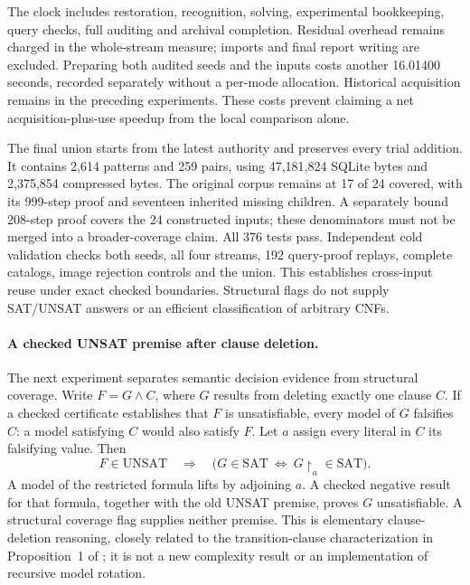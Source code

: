 \documentclass[11pt,a4paper]{article}
\numberwithin{equation}{section}
\theoremstyle{plain}
\theoremstyle{definition}
\theoremstyle{remark}
\begin{document}
The clock includes restoration, recognition, solving, experimental bookkeeping,
query checks, full auditing and archival completion. Residual overhead remains
charged in the whole-stream measure; imports and final report writing are
excluded. Preparing both audited seeds and the inputs costs another 16.01400
seconds, recorded separately without a per-mode allocation. Historical acquisition
remains in the preceding experiments. These costs prevent claiming a net
acquisition-plus-use speedup from the local comparison alone.

The final union starts from the latest authority and preserves every trial
addition. It contains 2,614 patterns and 259 pairs, using 47,181,824 SQLite bytes
and 2,375,854 compressed bytes. The original corpus remains at 17 of 24 covered,
with its 999-step proof and seventeen inherited missing children. A separately
bound 208-step proof covers the 24 constructed inputs; these denominators must
not be merged into a broader-coverage claim. All 376 tests pass. Independent cold
validation checks both seeds, all four streams, 192 query-proof replays, complete
catalogs, image rejection controls and the union. This establishes cross-input
reuse under exact checked boundaries. Structural flags do not supply SAT/UNSAT
answers or an efficient classification of arbitrary CNFs.

\paragraph{A checked UNSAT premise after clause deletion.}
The next experiment separates semantic decision evidence from structural
coverage. Write $F=G\land C$, where $G$ results from deleting exactly one clause
$C$. If a checked certificate establishes that $F$ is unsatisfiable, every
model of $G$ falsifies $C$: a model satisfying $C$ would also satisfy $F$.
Let $a$ assign every literal in $C$ its falsifying value. Then
\[
  F\in\mathrm{UNSAT}\quad\Longrightarrow\quad
  \bigl(G\in\mathrm{SAT}\ \Longleftrightarrow\ G\!\upharpoonright_a\in\mathrm{SAT}\bigr).
\]
A model of the restricted formula lifts by adjoining $a$. A checked negative
result for that formula, together with the old UNSAT premise, proves $G$
unsatisfiable. A structural coverage flag supplies neither premise. This is
elementary clause-deletion reasoning, closely related to the transition-clause
characterization in Proposition~1 of \citet{belov2011rotation}; it is not a new
complexity result or an implementation of recursive model rotation.
\end{document}
